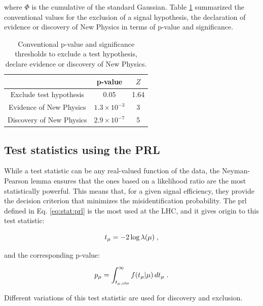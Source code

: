\noindent where $\Phi$ is the cumulative of the standard Gaussian. Table \ref{tab:stat:thresholds} summarized the conventional values for the exclusion of a signal hypothesis, the declaration of evidence or discovery of New Physics in terms of p-value and significance.

\begin{table}
\center
\begin{tabular}{|c|c|c|}
\hline 
 & p-value  & $Z$ \\ 
\hline 
\hline 
Exclude test hypothesis & 0.05 & 1.64 \\ 
\hline 
Evidence of New Physics & $1.3 \times 10^{-3}$ & 3 \\ 
\hline 
Discovery of New Physics & $2.9 \times 10^{-7}$ & 5 \\ 
\hline 
\end{tabular}
\caption{Conventional p-value and significance thresholds to exclude a test hypothesis, declare evidence or discovery of New Physics.}
\label{tab:stat:thresholds}
\end{table}




\subsection{Test statistics using the PRL}
\label{sec:teststat:prl}

While a test statistic can be any real-valued function of the data, the Neyman-Pearson lemma \cite{Neyman} ensures that the ones based on a likelihood ratio are the most statistically powerful. This means that, for a given signal efficiency, they provide the decision criterion that minimizes the misidentification probability. The \gls{prl} defined in Eq. \ref{eq:stat:prl} is the most used at the LHC, and it gives origin to this test statistic:

\begin{equation}
\label{eq:stat:tmu}
t_{\mu} = -2 \log \lambda(\mu) \; ,
\end{equation}

\noindent and the corresponding p-value:

\begin{equation}
\label{eq:stat:pmu}
p_{\mu} = \int_{t_{\mu,{\rm obs}}}^{\infty} f(t_{\mu} | \mu ) \,
d t_{\mu} \; .
\end{equation}

\noindent Different variations of this test statistic are used for discovery and exclusion.


